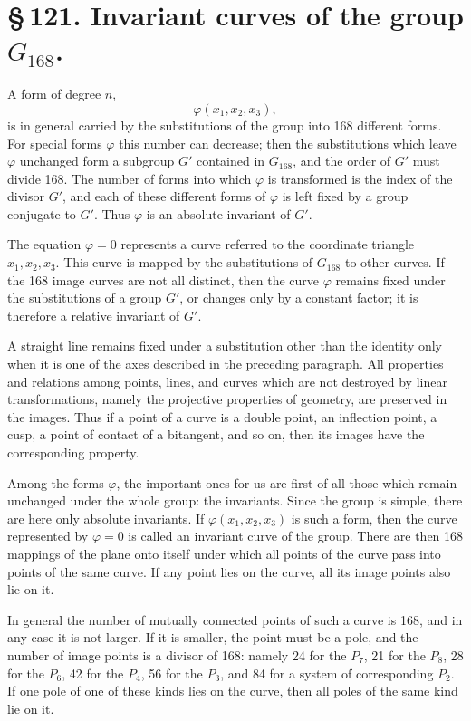 \documentclass[11pt]{article}
\begin{document}
\section*{\S\,121. Invariant curves of the group \(G_{168}\).}

A form of degree \(n\),
\begin{equation}
\varphi(x_1,x_2,x_3),
\end{equation}
is in general carried by the substitutions of the group into 168 different forms. For special forms \(\varphi\) this number can decrease; then the substitutions which leave \(\varphi\) unchanged form a subgroup \(G'\) contained in \(G_{168}\), and the order of \(G'\) must divide 168. The number of forms into which \(\varphi\) is transformed is the index of the divisor \(G'\), and each of these different forms of \(\varphi\) is left fixed by a group conjugate to \(G'\). Thus \(\varphi\) is an absolute invariant of \(G'\).

The equation \(\varphi=0\) represents a curve referred to the coordinate triangle \(x_1,x_2,x_3\). This curve is mapped by the substitutions of \(G_{168}\) to other curves. If the 168 image curves are not all distinct, then the curve \(\varphi\) remains fixed under the substitutions of a group \(G'\), or changes only by a constant factor; it is therefore a relative invariant of \(G'\).

A straight line remains fixed under a substitution other than the identity only when it is one of the axes described in the preceding paragraph. All properties and relations among points, lines, and curves which are not destroyed by linear transformations, namely the projective properties of geometry, are preserved in the images. Thus if a point of a curve is a double point, an inflection point, a cusp, a point of contact of a bitangent, and so on, then its images have the corresponding property.

Among the forms \(\varphi\), the important ones for us are first of all those which remain unchanged under the whole group: the invariants. Since the group is simple, there are here only absolute invariants. If \(\varphi(x_1,x_2,x_3)\) is such a form, then the curve represented by \(\varphi=0\) is called an invariant curve of the group. There are then 168 mappings of the plane onto itself under which all points of the curve pass into points of the same curve. If any point lies on the curve, all its image points also lie on it.

In general the number of mutually connected points of such a curve is 168, and in any case it is not larger. If it is smaller, the point must be a pole, and the number of image points is a divisor of 168: namely 24 for the \(P_7\), 21 for the \(P_8\), 28 for the \(P_6\), 42 for the \(P_4\), 56 for the \(P_3\), and 84 for a system of corresponding \(P_2\). If one pole of one of these kinds lies on the curve, then all poles of the same kind lie on it.
\end{document}
